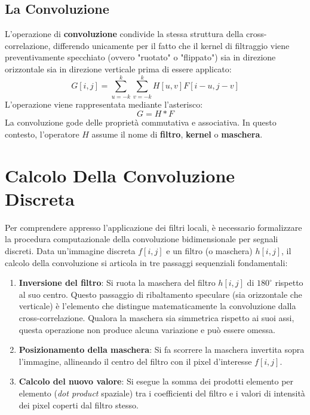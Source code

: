﻿\documentclass[11pt, a4paper]{article}
\begin{document}
\subsection{La Convoluzione}

L'operazione di \textbf{convoluzione} condivide la stessa struttura della cross-correlazione, differendo unicamente per il fatto che il kernel di filtraggio viene preventivamente specchiato (ovvero "ruotato" o "flippato") sia in direzione orizzontale sia in direzione verticale prima di essere applicato:
\[ \boxed{G[i, j] = \sum_{u=-k}^{k} \sum_{v=-k}^{k} H[u, v] F[i - u, j - v]} \]
L'operazione viene rappresentata mediante l'asterisco:
\[ G = H * F \]
La convoluzione gode delle proprietà commutativa e associativa. In questo contesto, l'operatore $H$ assume il nome di \textbf{filtro}, \textbf{kernel} o \textbf{maschera}.


\section{Calcolo Della Convoluzione Discreta}

Per comprendere appresso l'applicazione dei filtri locali, è necessario formalizzare la procedura computazionale della convoluzione bidimensionale per segnali discreti. Data un'immagine discreta $f[i, j]$ e un filtro (o maschera) $h[i, j]$, il calcolo della convoluzione si articola in tre passaggi sequenziali fondamentali:

\begin{enumerate}
    \item \textbf{Inversione del filtro}: Si ruota la maschera del filtro $h[i, j]$ di $180^\circ$ rispetto al suo centro. Questo passaggio di ribaltamento speculare (sia orizzontale che verticale) è l'elemento che distingue matematicamente la convoluzione dalla cross-correlazione. Qualora la maschera sia simmetrica rispetto ai suoi assi, questa operazione non produce alcuna variazione e può essere omessa.
    \item \textbf{Posizionamento della maschera}: Si fa scorrere la maschera invertita sopra l'immagine, allineando il centro del filtro con il pixel d'interesse $f[i, j]$.
    \item \textbf{Calcolo del nuovo valore}: Si esegue la somma dei prodotti elemento per elemento (\emph{dot product} spaziale) tra i coefficienti del filtro e i valori di intensità dei pixel coperti dal filtro stesso.
\end{enumerate}
\end{document}
